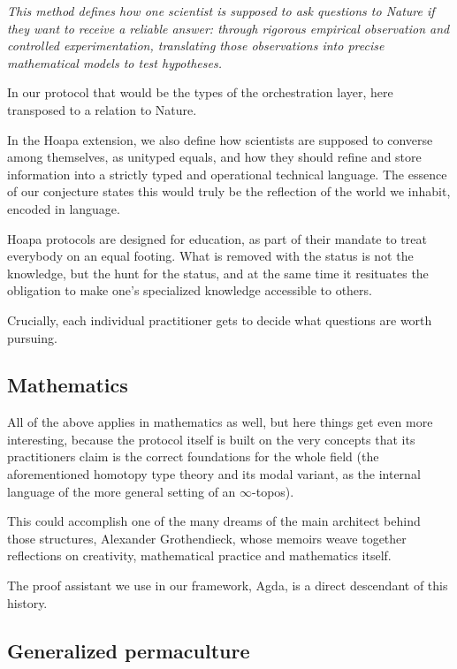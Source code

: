 \documentclass[11pt]{article}
\begin{document}
\emph{This method defines how one scientist is supposed to ask questions to Nature if they want to receive a reliable answer: through rigorous empirical observation and controlled experimentation, translating those observations into precise mathematical models to test hypotheses.}

In our protocol that would be the types of the orchestration layer, here transposed to a relation to Nature.

In the Hoapa extension, we also define how scientists are supposed to converse among themselves, as unityped equals, and how they should refine and store information into a strictly typed and operational technical language. The essence of our conjecture states this would truly be the reflection of the world we inhabit, encoded in language.

Hoapa protocols are designed for education, as part of their mandate to treat everybody on an equal footing. What is removed with the status is not the knowledge, but the hunt for the status, and at the same time it resituates the obligation to make one's specialized knowledge accessible to others.

Crucially, each individual practitioner gets to decide what questions are worth pursuing.

\subsection{Mathematics}

All of the above applies in mathematics as well, but here things get even more interesting, because the protocol itself is built on the very concepts that its practitioners claim is the correct foundations for the whole field (the aforementioned homotopy type theory and its modal variant, as the internal language of the more general setting of an \ensuremath{\infty}-topos).

This could accomplish one of the many dreams of the main architect behind those structures, Alexander Grothendieck, whose memoirs weave together reflections on creativity, mathematical practice and mathematics itself.

The proof assistant we use in our framework, Agda, is a direct descendant of this history.

\subsection{Generalized permaculture}
\end{document}
